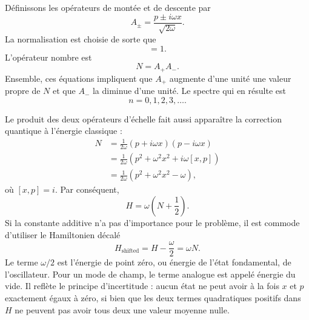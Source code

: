 Définissons les opérateurs de montée et de descente par
\begin{equation}
A_{\pm}=\frac{p\pm i\omega x}{\sqrt{2\omega}}.
\end{equation}
La normalisation est choisie de sorte que
\begin{equation}
[A_{-},A_{+}]=1.
\end{equation}
L’opérateur nombre est
\begin{equation}
N=A_{+}A_{-}.
\end{equation}
Ensemble, ces équations impliquent que \(A_{+}\) augmente d’une unité une valeur propre de \(N\) et que \(A_{-}\) la diminue d’une unité. Le spectre qui en résulte est
\begin{equation}
n=0,1,2,3,\ldots .
\end{equation}

Le produit des deux opérateurs d’échelle fait aussi apparaître la correction quantique à l’énergie classique :
\begin{align}
N
&=\frac{1}{2\omega}(p+i\omega x)(p-i\omega x)\\
&=\frac{1}{2\omega}\left(p^{2}+\omega^{2}x^{2}
 +i\omega[x,p]\right)\\
&=\frac{1}{2\omega}\left(p^{2}+\omega^{2}x^{2}-\omega\right),
\end{align}
où \([x,p]=i\). Par conséquent,
\begin{equation}
H=\omega\left(N+\frac12\right).
\end{equation}
Si la constante additive n’a pas d’importance pour le problème, il est commode d’utiliser le Hamiltonien décalé
\begin{equation}
H_{\mathrm{shifted}}=H-\frac{\omega}{2}=\omega N.
\end{equation}
Le terme \(\omega/2\) est l’énergie de point zéro, ou énergie de l’état fondamental, de l’oscillateur. Pour un mode de champ, le terme analogue est appelé énergie du vide. Il reflète le principe d’incertitude : aucun état ne peut avoir à la fois \(x\) et \(p\) exactement égaux à zéro, si bien que les deux termes quadratiques positifs dans \(H\) ne peuvent pas avoir tous deux une valeur moyenne nulle.

\begin{classroomqa}
\end{classroomqa}

